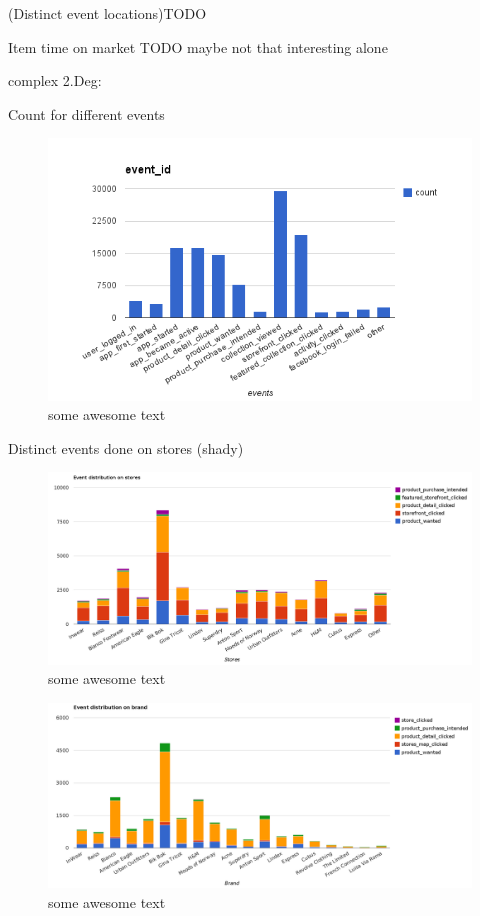         (Distinct event locations)TODO

        Item time on market TODO maybe not that interesting alone


    complex 2.Deg:

        Count for different events

\begin{figure}[H]
    \includegraphics[width=5in]{image/event_id.png}
    \centering
    \caption[Count for different events]{some awesome text}
    \label{figure:ratingdistr}
\end{figure}

        Distinct events done on stores (shady)

\begin{figure}[H]
    \includegraphics[width=5in]{image/event_distr.png}
    \centering
    \caption[Distribution of events on storefronts]{some awesome text}
    \label{figure:ratingdistr}
\end{figure}

\begin{figure}[H]
    \includegraphics[width=5in]{image/brand_distr.png}
    \centering
    \caption[Distribution of events on brands]{some awesome text}
    \label{figure:ratingdistr}
\end{figure}

